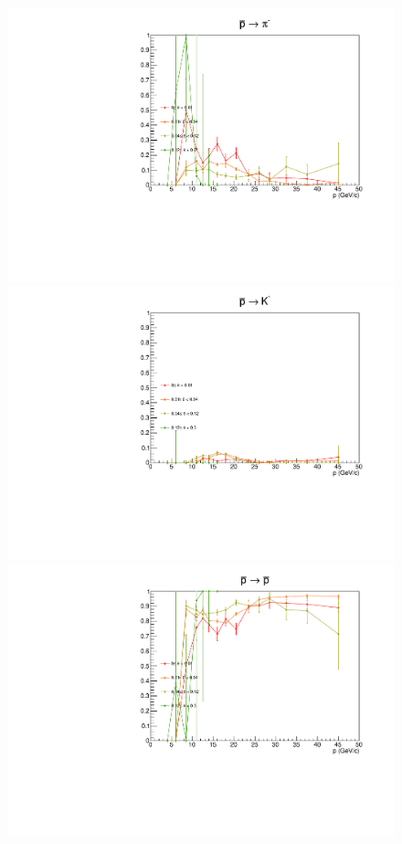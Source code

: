 \begin{figure}[!p]
  \centering
	\includegraphics[scale=0.38]{./gfx/pm_pi_less.pdf}
  \includegraphics[scale=0.38]{./gfx/pm_K_less.pdf}
  \includegraphics[scale=0.38]{./gfx/pm_p_less.pdf}

\end{figure}
